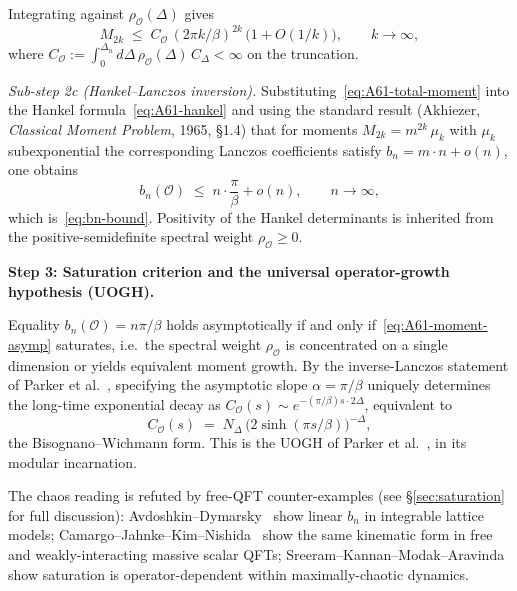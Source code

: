 \documentclass[12pt,a4paper]{article}
\begin{document}
Integrating against $\rho_\mathcal{O}(\Delta)$ gives
\begin{equation}
  M_{2k} \;\le\; C_\mathcal{O}\,(2\pi k/\beta)^{2k}
  \,\bigl(1 + O(1/k)\bigr),
  \qquad k\to\infty,
  \label{eq:A61-total-moment}
\end{equation}
where $C_\mathcal{O} := \int_0^{\Delta_n}d\Delta\,\rho_\mathcal{O}(\Delta)
\,C_\Delta < \infty$ on the truncation.

\emph{Sub-step 2c (Hankel--Lanczos inversion).}
Substituting~\eqref{eq:A61-total-moment} into the Hankel
formula~\eqref{eq:A61-hankel} and using the standard result (Akhiezer,
\emph{Classical Moment Problem}, 1965, \S 1.4) that for moments
$M_{2k} = m^{2k}\,\mu_k$ with $\mu_k$ subexponential the corresponding
Lanczos coefficients satisfy $b_n = m\cdot n + o(n)$, one obtains
\begin{equation}
  b_n(\mathcal{O}) \;\le\; n\cdot \frac{\pi}{\beta} + o(n),
  \qquad n \to \infty,
\end{equation}
which is~\eqref{eq:bn-bound}. Positivity of the Hankel determinants
is inherited from the positive-semidefinite spectral weight
$\rho_\mathcal{O} \ge 0$.

\medskip

\noindent\textbf{Step 3: Saturation criterion and the universal
operator-growth hypothesis (UOGH).}

Equality $b_n(\mathcal{O}) = n\pi/\beta$ holds asymptotically if and
only if~\eqref{eq:A61-moment-asymp} saturates, i.e.\ the spectral
weight $\rho_\mathcal{O}$ is concentrated on a single dimension or
yields equivalent moment growth. By the inverse-Lanczos statement of
Parker et al.~\cite[Theorem~2]{Parker2019}, specifying the asymptotic
slope $\alpha = \pi/\beta$ uniquely determines the long-time exponential
decay as $C_\mathcal{O}(s) \sim e^{-(\pi/\beta) s\cdot 2\Delta}$,
equivalent to
\begin{equation}
  C_\mathcal{O}(s)
  \;=\;
  N_\Delta\,\bigl(2\sinh(\pi s/\beta)\bigr)^{-\Delta},
  \label{eq:A61-bw-twopt-sat}
\end{equation}
the Bisognano--Wichmann form. This is the UOGH of Parker et
al.~\cite{Parker2019}, in its modular incarnation.

The chaos reading is refuted by free-QFT counter-examples
(see \S\ref{sec:saturation} for full discussion):
Avdoshkin--Dymarsky~\cite{AvdoshkinDymarsky2019} show linear $b_n$
in integrable lattice models; Camargo--Jahnke--Kim--Nishida~\cite{Camargo2023}
show the same kinematic form in free and weakly-interacting massive
scalar QFTs; Sreeram--Kannan--Modak--Aravinda~\cite{Sreeram2025}
show saturation is operator-dependent within maximally-chaotic dynamics.
\end{document}
